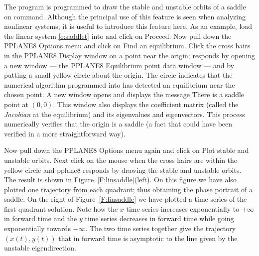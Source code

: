 \documentclass{ximera}
\begin{document}
The program {\pplane} is programmed to draw the stable and unstable
orbits of a saddle on command. Although the principal use of this
feature is seen when analyzing nonlinear systems, it is useful to
introduce this feature here.  As an example, load the linear system
\eqref{e:saddlet} into {\pplane} and click on {\sf Proceed}.  Now
pull down the {\sf PPLANE8 Options} menu and click on {\sf Find an
equilibrium}.  Click the cross hairs in the {\sf PPLANE8 Display}
window on a point near the origin; {\pplane} responds by
opening a new window --- the {\sf PPLANE8 Equilibrium point data}
window --- and by putting a small yellow circle about the
origin.  The circle indicates that the numerical algorithm
programmed into {\pplane} has detected an equilibrium near
the chosen point. A new window opens and displays the message
{\sf There is a saddle point at} $(0,0)$.  This window also displays the
coefficient matrix (called the {\em Jacobian} at the equilibrium) and its eigenvalues
and eigenvectors.  This process numerically verifies that the origin
is a saddle (a fact that could have been verified in a more
straightforward way).

Now pull down the {\sf PPLANE8 Options} menu again and click on
{\sf Plot stable and unstable orbits}.  Next click on the mouse
when the cross hairs are within the yellow circle and {\sf
pplane8} responds by drawing the stable and unstable orbits.
The result is shown in Figure~\ref{F:linsaddle}(left).
On this figure we have also plotted one trajectory
from each quadrant; thus obtaining the phase portrait of a saddle.
On the right of Figure~\ref{F:linsaddle} we have plotted a
time series of the first quadrant solution.  Note how the $x$
time series increases exponentially to $+\infty$ in forward time and 
the $y$ time series decreases in forward time while going exponentially 
towards $-\infty$.  The two time series together
give the trajectory $(x(t),y(t))$ that in forward time is asymptotic
to the line given by the unstable eigendirection.



\EXER

\TEXER
\end{document}
